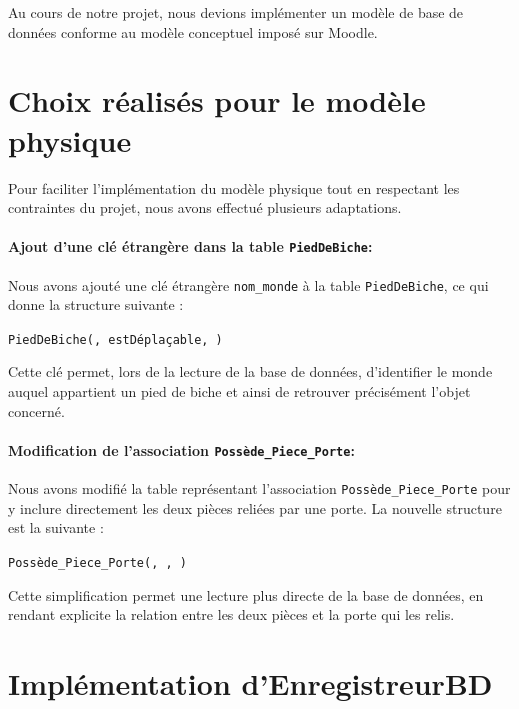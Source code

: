Au cours de notre projet, nous devions implémenter un modèle de base de données conforme au modèle conceptuel imposé sur Moodle.



\section{Choix réalisés pour le modèle physique}

Pour faciliter l’implémentation du modèle physique tout en respectant les contraintes du projet, nous avons effectué plusieurs adaptations.

\paragraph{Ajout d’une clé étrangère dans la table \texttt{PiedDeBiche}:}  
Nous avons ajouté une clé étrangère \texttt{nom\_monde} à la table \texttt{PiedDeBiche}, ce qui donne la structure suivante :

\footnotesize
\begin{center}
\texttt{PiedDeBiche(}\texttt{, estDéplaçable, \textcolor{vert}{})}
\end{center}
\normalsize

Cette clé permet, lors de la lecture de la base de données, d’identifier le monde auquel appartient un pied de biche et ainsi de retrouver précisément l’objet concerné.

\paragraph{Modification de l’association \texttt{Possède\_Piece\_Porte}:}  
Nous avons modifié la table représentant l’association \texttt{Possède\_Piece\_Porte} pour y inclure directement les deux pièces reliées par une porte. La nouvelle structure est la suivante :

\footnotesize
\begin{center}
\texttt{Possède\_Piece\_Porte(}\texttt{, }\texttt{, }\texttt{)}
\end{center}
\normalsize

Cette simplification permet une lecture plus directe de la base de données, en rendant explicite la relation entre les deux pièces et la porte qui les relis.

\section{Implémentation d'EnregistreurBD}

